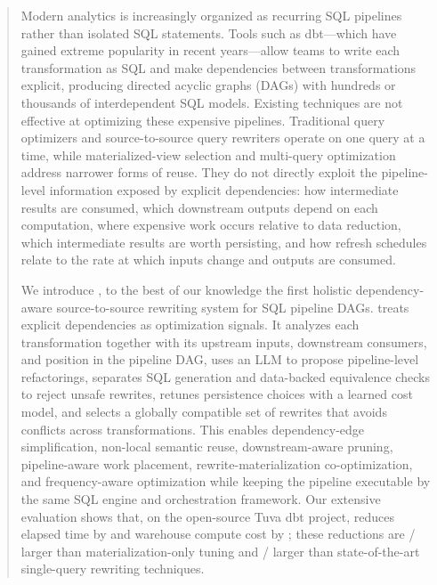 \begin{abstract}
Modern analytics is increasingly organized as recurring SQL pipelines rather than isolated SQL statements. Tools such  as dbt---which have gained extreme popularity in recent years---allow teams to write each transformation as SQL and make dependencies between transformations explicit, producing directed acyclic graphs (DAGs) with hundreds or thousands of interdependent SQL models. Existing techniques are not effective at optimizing these expensive pipelines. Traditional query optimizers and source-to-source query rewriters operate on one query at a time, while materialized-view selection and multi-query optimization address narrower forms of reuse. They do not directly exploit the pipeline-level information exposed by explicit dependencies: how intermediate results are consumed, which downstream outputs depend on each computation, where expensive work occurs relative to data reduction, which intermediate results are worth persisting, and how refresh schedules relate to the rate at which inputs change and outputs are consumed.

We introduce \tool, to the best of our knowledge the first holistic dependency-aware source-to-source rewriting system for SQL pipeline DAGs. \tool treats explicit dependencies as optimization signals.
It analyzes each transformation together with its upstream inputs, downstream consumers, and position in the pipeline DAG, uses an LLM to propose pipeline-level refactorings, separates SQL generation and data-backed equivalence checks to reject unsafe rewrites, retunes persistence choices with a learned cost model, and 
selects a globally compatible set of rewrites that avoids conflicts across transformations.
This enables dependency-edge simplification, non-local semantic reuse, downstream-aware pruning, pipeline-aware work placement, rewrite-materialization co-optimization, and frequency-aware optimization while keeping the pipeline executable by the same SQL engine and orchestration framework. Our extensive evaluation shows that, on the open-source Tuva dbt project, \tool reduces elapsed time by  and warehouse compute cost by ; these reductions are / larger than materialization-only tuning and / larger than state-of-the-art single-query rewriting techniques.
\end{abstract}
